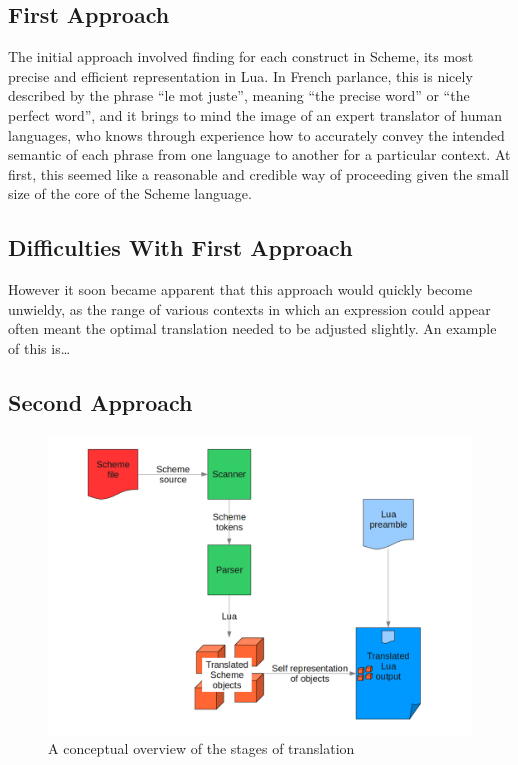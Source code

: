 \subsection{First Approach}

The initial approach involved finding for each construct in Scheme, its most
precise and efficient representation in Lua. In French parlance, this is nicely
described by the phrase ``le mot juste'', meaning ``the precise word'' or ``the
perfect word'', and it brings to mind the image of an expert translator of
human languages, who knows through experience how to accurately convey the
intended semantic of each phrase from one language to another for a particular
context.  At first, this seemed like a reasonable and credible way of
proceeding given the small size of the core of the Scheme language.

\subsection{Difficulties With First Approach}

However it soon became apparent that this approach would quickly become
unwieldy, as the range of various contexts in which an expression could appear
often meant the optimal translation needed to be adjusted slightly. An example
of this is\ldots

\subsection{Second Approach}

\begin{figure}
\centering
\includegraphics[width=\textwidth]{overview.png}
\caption{A conceptual overview of the stages of translation}
\label{fig:overview}
\end{figure}

